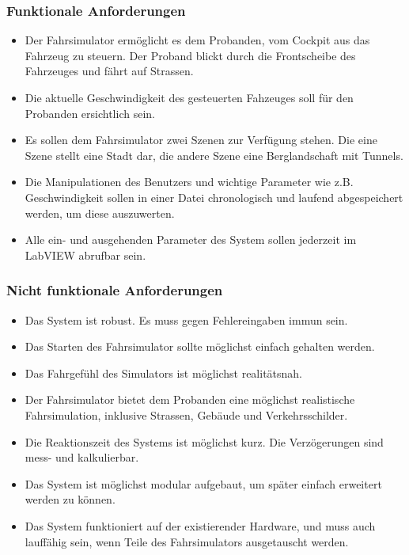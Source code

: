 \subsubsection{Funktionale Anforderungen}
\begin{itemize}
\item Der Fahrsimulator ermöglicht es dem Probanden, vom Cockpit aus das Fahrzeug zu steuern. Der Proband blickt durch die Frontscheibe des Fahrzeuges und fährt auf Strassen.
\item Die aktuelle Geschwindigkeit des gesteuerten Fahzeuges soll für den Probanden ersichtlich sein. 
\item Es sollen dem Fahrsimulator zwei Szenen zur Verfügung stehen. Die eine Szene stellt eine Stadt dar, die andere Szene eine Berglandschaft mit Tunnels.
\item Die Manipulationen des Benutzers und wichtige Parameter wie z.B. Geschwindigkeit sollen in einer Datei chronologisch und laufend abgespeichert werden, um diese auszuwerten.
\item Alle ein- und ausgehenden Parameter des System sollen jederzeit im LabVIEW abrufbar sein.
\end{itemize}

\subsubsection {Nicht funktionale Anforderungen}
\renewcommand{\labelenumi}{\alph{enumi})}

\begin{itemize}
\item Das System ist robust. Es muss gegen Fehlereingaben immun sein. 
\item Das Starten des Fahrsimulator sollte möglichst einfach gehalten werden.
\item Das Fahrgefühl des Simulators ist möglichst realitätsnah.
\item Der Fahrsimulator bietet dem Probanden eine möglichst realistische Fahrsimulation, inklusive Strassen, Gebäude und Verkehrsschilder. 
\item Die Reaktionszeit des Systems ist möglichst kurz. Die Verzögerungen sind mess-  und kalkulierbar.
\item Das System ist möglichst modular aufgebaut, um später einfach erweitert werden zu können.
\item Das System funktioniert auf der existierender Hardware, und muss auch lauffähig sein, wenn Teile des Fahrsimulators ausgetauscht werden. 
\end{itemize}
